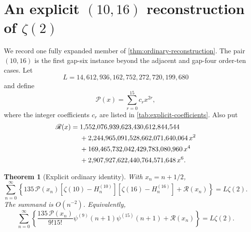 \documentclass[11pt]{article}
\newtheorem{theorem}{Theorem}[section]
\theoremstyle{definition}
\begin{document}
 \section{An explicit \texorpdfstring{$(10,16)$}{(10,16)} reconstruction of \texorpdfstring{$\zeta(2)$}{zeta(2)}}
\label{sec:explicit-identity}

We record one fully expanded member of
\cref{thm:ordinary-reconstruction}.  The pair $(10,16)$ is the first
gap-six instance beyond the adjacent and gap-four order-ten cases.  Let
\begin{equation}
 L=14{,}612{,}936{,}162{,}752{,}272{,}720{,}199{,}680
 \label{eq:explicit-L}
\end{equation}
and define
\begin{equation}
 \mathscr P(x)=\sum_{r=0}^{15}c_rx^{2r},
 \label{eq:explicit-P}
\end{equation}
where the integer coefficients $c_r$ are listed in
\cref{tab:explicit-coefficients}.  Also put
\begin{align}
 \mathscr R(x)={}&
 1{,}552{,}076{,}939{,}623{,}430{,}612{,}844{,}544
 \notag\\
 &+2{,}244{,}965{,}091{,}528{,}662{,}071{,}640{,}064\,x^2
 \notag\\
 &+169{,}465{,}732{,}042{,}429{,}783{,}080{,}960\,x^4
 \notag\\
 &+2{,}907{,}927{,}622{,}440{,}764{,}571{,}648\,x^6.
 \label{eq:explicit-R}
\end{align}

\begin{theorem}[Explicit ordinary identity]
\label{thm:explicit-1016}
With $x_n=n+1/2$,
\begin{equation}
 \boxed{\displaystyle
 \sum_{n=0}^{\infty}
 \left\{
 135\,\mathscr P(x_n)
 [\zeta(10)-H_n^{(10)}][\zeta(16)-H_n^{(16)}]
 +\mathscr R(x_n)
 \right\}=L\zeta(2).}
 \label{eq:explicit-1016}
\end{equation}
The summand is $O(n^{-2})$.  Equivalently,
\begin{equation}
 \sum_{n=0}^{\infty}
 \left\{
 \frac{135\,\mathscr P(x_n)}{9!15!}
 \psi^{(9)}(n+1)\psi^{(15)}(n+1)
 +\mathscr R(x_n)
 \right\}=L\zeta(2).
 \label{eq:explicit-1016-polygamma}
\end{equation}
\end{theorem}
\end{document}
